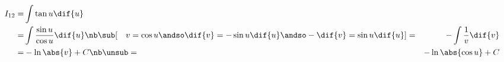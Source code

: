 \begin{samepage}
\begin{align*}
I_{12}
=&  \int  \tan{u} \dif{u} \\
=& \int  \frac{\sin{u}}{\cos{u}} \dif{u}
\nb\sub[\quad
  v=\cos{u} \andso  \dif{v} = -\sin{u}\dif{u}
            \andso -\dif{v} = \sin{u}\dif{u}
]
=& - \int \frac{1}{v}\dif{v} \\
=& - \ln \abs{v} + C
\nb\unsub
  =& - \ln \abs{\cos{u}} + C
\end{align*}


\end{samepage}
